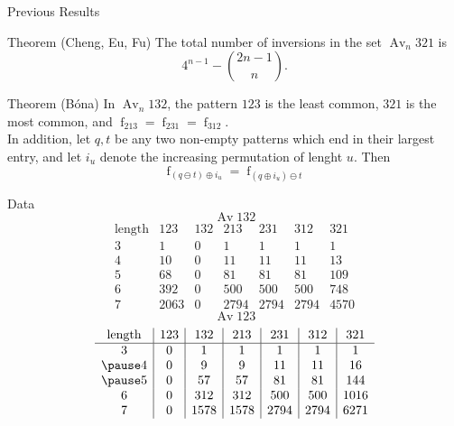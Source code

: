 \documentclass{beamer}
\DeclareMathOperator{\num}{f}
\DeclareMathOperator{\Av}{Av}
\begin{document}
\begin{frame}{Previous Results}

  \begin{block}{Theorem (Cheng, Eu, Fu)}
    The total number of inversions in the set $\Av_n 321 $ is 
    $$  4^{n-1} - \binom{2n-1}{n}.$$
  \end{block}
    
  \pause 

  \begin{block}{Theorem (B\'ona)}
    In $\Av_n 132$, the pattern $123$ is the least common, $321$ is the most
    common, and $\num_{213} = \num_{231} = \num_{312}$. \\
    \pause
    In addition, let $q, t$ be any two non-empty patterns  which end in their
    largest entry, and let $i_u$ denote the increasing permutation of lenght
    $u$. Then
    {\Large
    $$ \num_{(q \ominus t ) \oplus i_u} = \num_{(q \oplus i_u) \ominus t}$$
    }
  \end{block}
    
\end{frame}




\begin{frame}{Data}
  \pause
  \vspace{-1pc}
  $$ \Av 132 $$
  $$\begin{array}{c|c|c|c|c|c|c}
      \text{length} & 123 & 132 & 213 & 231
      & 312 & 321 \\
      \hline
     3  & 1     &    0  &    1 &    1 &    1 &    1  \\
     4  & 10    &    0  &   11 &   11 &   11 &   13  \\
     5  & 68    &    0  &   81 &   81 &   81 &  109  \\
     6  & 392   &    0  &  500 &  500 &  500 &  748  \\ 
     7  & 2063  &    0  & 2794 & 2794 & 2794 & 4570   
   \end{array}
  $$
  \pause
  $$\Av 123 $$
  $$\begin{array}{c|c|c|c|c|c|c}
      \text{length} & 123 & 132 & 213 & 231
      & 312 & 321 \\
      \hline
      3  & 0     &    1  &    1 &    1 &    1 &    1  \\
      \pause
      4  & 0     &    9  &    9 &   11 &   11 &   16  \\
      \pause
      5  & 0     &    57 &   57 &   81 &   81 &  144  \\
      6  & 0     &   312 &  312 &  500 &  500 & 1016  \\ 
      7  & 0     &  1578 & 1578 & 2794 & 2794 & 6271   
    \end{array}
  $$
\end{frame}
\end{document}
